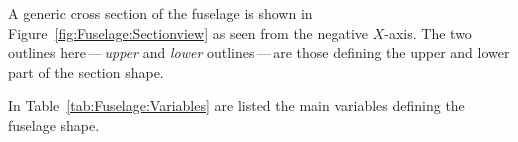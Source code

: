 \documentclass[a4paper]{article}
\begin{document}
%
%

A generic cross section of the fuselage is shown in Figure~\ref{fig:Fuselage:Sectionview}
as seen from the negative $X$-axis. The two outlines here\,---\,\emph{upper} and \emph{lower} 
outlines\,---\,are those defining the upper and lower part of the section shape.


In Table~\ref{tab:Fuselage:Variables} are listed the main variables defining the 
fuselage shape.
\end{document}
